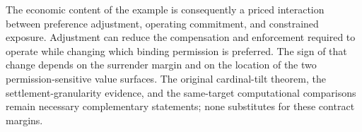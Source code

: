 The economic content of the example is consequently a priced interaction between preference adjustment, operating commitment, and constrained exposure. Adjustment can reduce the compensation and enforcement required to operate while changing which binding permission is preferred. The sign of that change depends on the surrender margin and on the location of the two permission-sensitive value surfaces. The original cardinal-tilt theorem, the settlement-granularity evidence, and the same-target computational comparisons remain necessary complementary statements; none substitutes for these contract margins.

